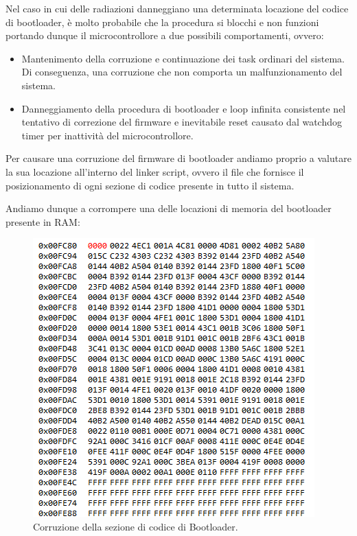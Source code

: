\documentclass[LaM,binding=0.6cm,oneside]{../sapthesis}
\begin{document}
\newline
Nel caso in cui delle radiazioni danneggiano una determinata locazione del codice di bootloader, è molto probabile che la procedura si blocchi e non funzioni portando dunque il microcontrollore
a due possibili comportamenti, ovvero:
\begin{itemize}
    \item Mantenimento della corruzione e continuazione dei task ordinari del sistema. Di conseguenza, una corruzione che non comporta un malfunzionamento del sistema.
    \item Danneggiamento della procedura di bootloader e loop infinita consistente nel tentativo di correzione del firmware e inevitabile reset causato dal watchdog timer per inattività del microcontrollore.
\end{itemize}


Per causare una corruzione del firmware di bootloader andiamo proprio a valutare la sua locazione all'interno del linker script, ovvero il file che fornisce il posizionamento di ogni sezione di codice presente in tutto il sistema.

Andiamo dunque a corrompere una delle locazioni di memoria del bootloader presente in RAM:

\begin{figure}[htbp]
\centerline{\includegraphics[scale=0.64]{examples/BootloaderCorruption.PNG}}
\caption{Corruzione della sezione di codice di Bootloader.}
\label{fig}
\end{figure}
\newline
\end{document}
